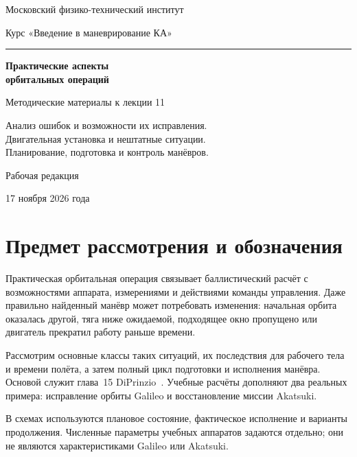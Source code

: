 \documentclass[a4paper,11pt]{article}
\numberwithin{equation}{section}
\begin{document}
\begin{titlepage}
\centering
{\large Московский физико-технический институт\par}
\vspace{8mm}
{\large Курс «Введение в маневрирование КА»\par}
\vspace{30mm}
{\color{accent}\rule{28mm}{.8pt}\par}
\vspace{9mm}
{\LARGE\bfseries Практические аспекты\\[3mm]орбитальных операций\par}
\vspace{11mm}
{\large Методические материалы к лекции 11\par}
\vspace{8mm}
{Анализ ошибок и возможности их исправления.\\
Двигательная установка и нештатные ситуации.\\
Планирование, подготовка и контроль манёвров.\par}
\vfill
{Рабочая редакция\par}
\vspace{3mm}
{17 ноября 2026 года\par}
\end{titlepage}
\setcounter{page}{2}
\begingroup\small
\setlength{\parskip}{0pt}
\tableofcontents
\endgroup
\clearpage

\section*{Предмет рассмотрения и обозначения}

Практическая орбитальная операция связывает баллистический расчёт
с возможностями аппарата, измерениями и действиями команды управления.
Даже правильно найденный манёвр может потребовать изменения:
начальная орбита оказалась другой, тяга ниже ожидаемой,
подходящее окно пропущено или двигатель прекратил работу раньше времени.

Рассмотрим основные классы таких ситуаций, их последствия для
рабочего тела и времени полёта, а затем полный цикл подготовки
и исполнения манёвра. Основой служит глава~15
DiPrinzio~\cite{diprinzio}. Учебные расчёты дополняют два реальных
примера: исправление орбиты Galileo и восстановление миссии Akatsuki.

В схемах используются плановое состояние, фактическое исполнение
и варианты продолжения. Численные параметры учебных аппаратов
задаются отдельно; они не являются характеристиками Galileo или Akatsuki.
\end{document}
